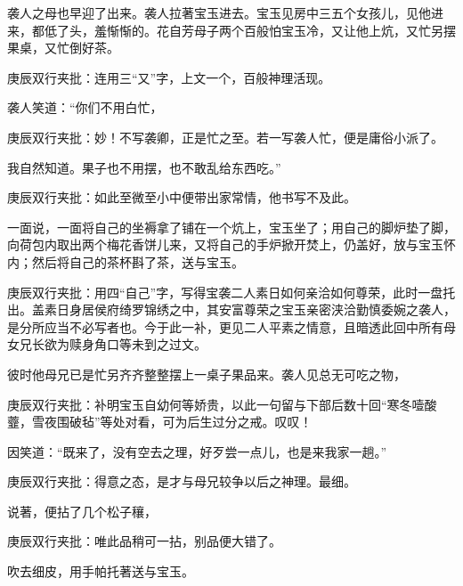 \begin{parag}


    袭人之母也早迎了出来。袭人拉著宝玉进去。宝玉见房中三五个女孩儿，见他进来，都低了头，羞惭惭的。花自芳母子两个百般怕宝玉冷，又让他上炕，又忙另摆果桌，又忙倒好茶。\begin{note}庚辰双行夹批：连用三“又”字，上文一个，百般神理活现。\end{note}袭人笑道：“你们不用白忙，\begin{note}庚辰双行夹批：妙！不写袭卿，正是忙之至。若一写袭人忙，便是庸俗小派了。\end{note}我自然知道。果子也不用摆，也不敢乱给东西吃。”\begin{note}庚辰双行夹批：如此至微至小中便带出家常情，他书写不及此。\end{note}一面说，一面将自己的坐褥拿了铺在一个炕上，宝玉坐了；用自己的脚炉垫了脚，向荷包内取出两个梅花香饼儿来，又将自己的手炉掀开焚上，仍盖好，放与宝玉怀内；然后将自己的茶杯斟了茶，送与宝玉。\begin{note}庚辰双行夹批：用四“自己”字，写得宝袭二人素日如何亲洽如何尊荣，此时一盘托出。盖素日身居侯府绮罗锦绣之中，其安富尊荣之宝玉亲密浃洽勤慎委婉之袭人，是分所应当不必写者也。今于此一补，更见二人平素之情意，且暗透此回中所有母女兄长欲为赎身角口等未到之过文。\end{note}彼时他母兄已是忙另齐齐整整摆上一桌子果品来。袭人见总无可吃之物，\begin{note}庚辰双行夹批：补明宝玉自幼何等娇贵，以此一句留与下部后数十回“寒冬噎酸虀，雪夜围破毡”等处对看，可为后生过分之戒。叹叹！\end{note}因笑道：“既来了，没有空去之理，好歹尝一点儿，也是来我家一趟。”\begin{note}庚辰双行夹批：得意之态，是才与母兄较争以后之神理。最细。\end{note}说著，便拈了几个松子穰，\begin{note}庚辰双行夹批：唯此品稍可一拈，别品便大错了。\end{note}吹去细皮，用手帕托著送与宝玉。
\end{parag}



